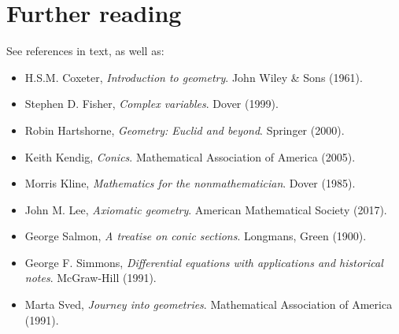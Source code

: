 \documentclass[a4paper,leqno,10pt]{article}
\theoremstyle{exercise}
\theoremstyle{plain}
\theoremstyle{definition}
\theoremstyle{remark}
\begin{document}
\section{Further reading}
See references in text, as well as:
\begin{itemize}
  \item H.S.M. Coxeter, \emph{Introduction to geometry}. John Wiley \& Sons (1961).
  \item Stephen D. Fisher, \emph{Complex variables}. Dover (1999).
  \item Robin Hartshorne, \emph{Geometry: Euclid and beyond}. Springer (2000).
  \item Keith Kendig, \emph{Conics}. Mathematical Association of America (2005).
  \item Morris Kline, \emph{Mathematics for the nonmathematician}. Dover (1985).
  \item John M. Lee, \emph{Axiomatic geometry}. American Mathematical Society (2017).
  \item George Salmon, \emph{A treatise on conic sections}. Longmans, Green (1900).
  \item George F. Simmons, \emph{Differential equations with applications and historical notes}. McGraw-Hill (1991).
  \item Marta Sved, \emph{Journey into geometries}. Mathematical Association of America (1991).
\end{itemize}
\end{document}
